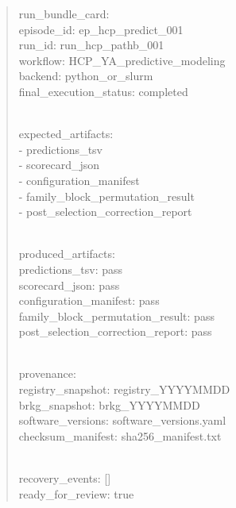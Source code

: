 \begin{quote}
run\_\allowbreak{}bundle\_\allowbreak{}card:\\
episode\_\allowbreak{}id: ep\_\allowbreak{}hcp\_\allowbreak{}predict\_\allowbreak{}001\\
run\_\allowbreak{}id: run\_\allowbreak{}hcp\_\allowbreak{}pathb\_\allowbreak{}001\\
workflow: HCP\_\allowbreak{}YA\_\allowbreak{}predictive\_\allowbreak{}modeling\\
backend: python\_\allowbreak{}or\_\allowbreak{}slurm\\
final\_\allowbreak{}execution\_\allowbreak{}status: completed\\
\strut \\
expected\_\allowbreak{}artifacts:\\
- predictions\_\allowbreak{}tsv\\
- scorecard\_\allowbreak{}json\\
- configuration\_\allowbreak{}manifest\\
- family\_\allowbreak{}block\_\allowbreak{}permutation\_\allowbreak{}result\\
- post\_\allowbreak{}selection\_\allowbreak{}correction\_\allowbreak{}report\\
\strut \\
produced\_\allowbreak{}artifacts:\\
predictions\_\allowbreak{}tsv: pass\\
scorecard\_\allowbreak{}json: pass\\
configuration\_\allowbreak{}manifest: pass\\
family\_\allowbreak{}block\_\allowbreak{}permutation\_\allowbreak{}result: pass\\
post\_\allowbreak{}selection\_\allowbreak{}correction\_\allowbreak{}report: pass\\
\strut \\
provenance:\\
registry\_\allowbreak{}snapshot: registry\_\allowbreak{}YYYYMMDD\\
brkg\_\allowbreak{}snapshot: brkg\_\allowbreak{}YYYYMMDD\\
software\_\allowbreak{}versions: software\_\allowbreak{}versions.yaml\\
checksum\_\allowbreak{}manifest: sha256\_\allowbreak{}manifest.txt\\
\strut \\
recovery\_\allowbreak{}events: {[}{]}\\
ready\_\allowbreak{}for\_\allowbreak{}review: true


\end{quote}
